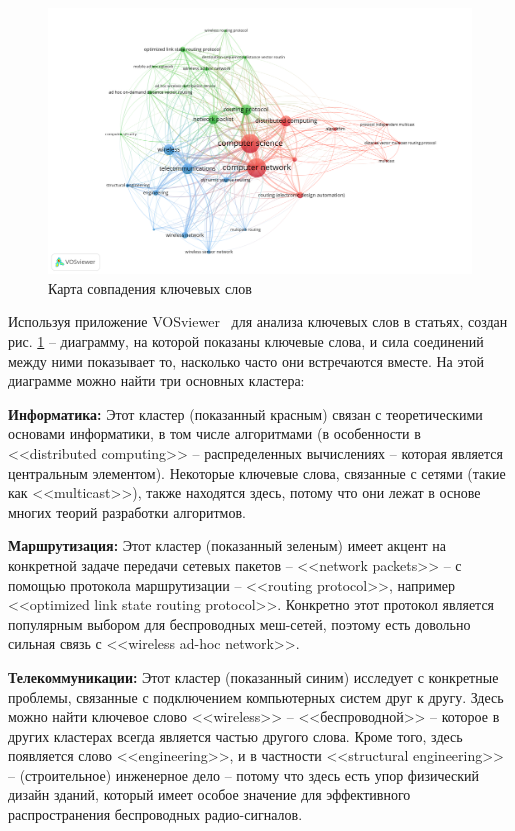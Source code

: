 \documentclass[%
]{report}
\begin{document}
\begin{figure}[p]
\centering
\includegraphics[width=\textwidth]{./assets/co-occurence.png}
\caption{Карта совпадения ключевых слов}
\label{pic:vosviewer}
\end{figure}

Используя приложение VOSviewer~\cite{vanEck2010}
для анализа ключевых слов в статьях,
создан рис. \ref{pic:vosviewer} -- 
диаграмму, на которой показаны ключевые слова,
и сила соединений между ними показывает то,
насколько часто они встречаются вместе.
На этой диаграмме можно найти
три основных кластера:

\textbf{Информатика:} Этот кластер (показанный красным)
связан с теоретическими основами информатики,
в том числе алгоритмами
(в особенности в <<distributed computing>> -- распределенных вычислениях -- 
которая является центральным элементом).
Некоторые ключевые слова,
связанные с сетями (такие как <<multicast>>),
также находятся здесь,
потому что они лежат в основе
многих теорий разработки алгоритмов.

\textbf{Маршрутизация:} Этот кластер (показанный зеленым)
имеет акцент на конкретной задаче
передачи сетевых пакетов -- 
<<network packets>> -- с помощью протокола маршрутизации -- <<routing protocol>>,
например <<optimized link state routing protocol>>.
Конкретно этот протокол является популярным выбором для
беспроводных меш-сетей,
поэтому есть довольно сильная связь с <<wireless ad-hoc network>>.

\textbf{Телекоммуникации:} Этот кластер (показанный синим)
исследует с конкретные проблемы,
связанные с подключением компьютерных систем друг к другу.
Здесь можно найти ключевое слово <<wireless>> -- <<беспроводной>> -- 
которое в других кластерах всегда является частью другого слова. 
Кроме того, здесь появляется слово <<engineering>>,
и в частности <<structural engineering>> -- (строительное) инженерное дело --
потому что здесь есть упор физический дизайн зданий,
который имеет особое значение для эффективного распространения
беспроводных радио-сигналов.
\end{document}
